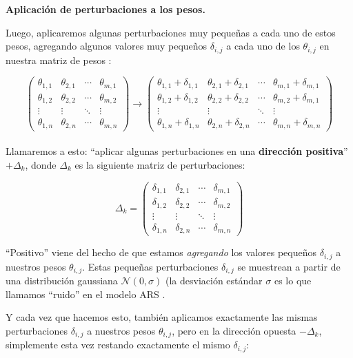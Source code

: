 \documentclass[
]{book}
\begin{document}
\textbf{Aplicación de perturbaciones a los pesos.}

Luego, aplicaremos algunas perturbaciones muy pequeñas a cada uno de estos pesos, agregando algunos valores muy pequeños \(\delta_{i, j}\) a cada uno de los \(\theta_{i, j}\) en nuestra matriz de pesos :

\[
\begin{pmatrix}
\theta_{1,1} & \theta_{2,1} & \cdots & \theta_{m,1} \\
\theta_{1,2} & \theta_{2,2} & \cdots & \theta_{m,2} \\
\vdots & \vdots & \ddots & \vdots \\
\theta_{1,n} & \theta_{2,n} & \cdots & \theta_{m,n}
\end{pmatrix}
\longrightarrow
\begin{pmatrix}
\theta_{1,1} + \delta_{1,1} & \theta_{2,1} + \delta_{2,1} & \cdots & \theta_{m,1} + \delta_{m,1} \\
\theta_{1,2} + \delta_{1,2} & \theta_{2,2} + \delta_{2,2} & \cdots & \theta_{m,2} + \delta_{m,1} \\
\vdots & \vdots & \ddots & \vdots \\
\theta_{1,n} + \delta_{1,n} & \theta_{2,n} + \delta_{2,n} & \cdots & \theta_{m,n} + \delta_{m,n}
\end{pmatrix}
\]\\

Llamaremos a esto: ``aplicar algunas perturbaciones en una \textbf{dirección positiva}'' \(+\Delta_k\), donde \(\Delta_k\) es la siguiente matriz de perturbaciones:

\[
\Delta_k
=
\begin{pmatrix}
\delta_{1,1} & \delta_{2,1} & \cdots & \delta_{m,1} \\
\delta_{1,2} & \delta_{2,2} & \cdots & \delta_{m,2} \\
\vdots & \vdots & \ddots & \vdots \\
\delta_{1,n} & \delta_{2,n} & \cdots & \delta_{m,n}
\end{pmatrix}
\]

``Positivo'' viene del hecho de que estamos \emph{agregando} los valores pequeños \(\delta_{i, j}\) a nuestros pesos \(\theta_{i, j}\). Estas pequeñas perturbaciones \(\delta_{i, j}\) se muestrean a partir de una distribución gaussiana \(\mathcal{N}(0, \sigma)\) (la desviación estándar \(\sigma\) es lo que llamamos ``ruido'' en el modelo ARS .

Y cada vez que hacemos esto, también aplicamos exactamente las mismas perturbaciones \(\delta_{i, j}\) a nuestros pesos \(\theta_{i, j}\), pero en la dirección opuesta \(-\Delta_k\), simplemente esta vez restando exactamente el mismo \(\delta_{i, j}\):
\end{document}
